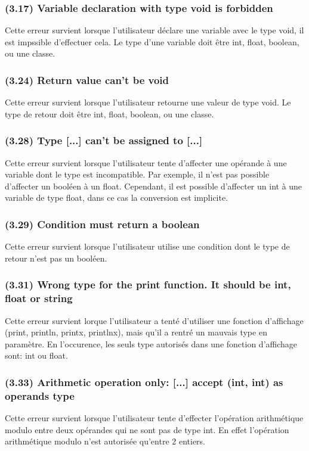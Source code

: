 \documentclass[12pt, a4paper, one side]{article}
\begin{document}
    \subsubsection{(3.17) Variable declaration with type void is forbidden}
    Cette erreur survient lorsque l'utilisateur déclare une variable avec le type void, il est impssible d'effectuer cela. Le type d'une variable doit être int, float, boolean, ou une classe.

    \subsubsection{(3.24) Return value can't be void}
    Cette erreur survient lorsque l'utilisateur retourne une valeur de type void. Le type de retour doit être int, float, boolean, ou une classe.

    \subsubsection{(3.28) Type [...] can't be assigned to [...]}
    Cette erreur survient lorsque l'utilisateur tente d'affecter une opérande à une variable dont le type est incompatible. Par exemple, il n'est pas possible d'affecter un booléen à un float. Cependant, il est possible d'affecter un int à une variable de type float, dans ce cas la conversion est implicite.

    \subsubsection{(3.29) Condition must return a boolean}
    Cette erreur survient lorsque l'utilisateur utilise une condition dont le type de retour n'est pas un booléen.

    \subsubsection{(3.31) Wrong type for the print function. It should be int, float or string}
    Cette erreur survient lorque l'utilisateur a tenté d'utiliser une fonction d'affichage (print, println, printx, printlnx),
    mais qu'il a rentré un mauvais type en paramètre. En l'occurence, les seuls type autorisés dans une
    fonction d'affichage sont: int ou float.

    \subsubsection{(3.33) Arithmetic operation only: [...] accept (int, int) as operands type}
    Cette erreur survient lorsque l'utilisateur tente d'effecter l'opération arithmétique modulo entre deux opérandes qui ne sont pas de type int. En effet l'opération arithmétique modulo n'est autorisée qu'entre 2 entiers.
\end{document}
